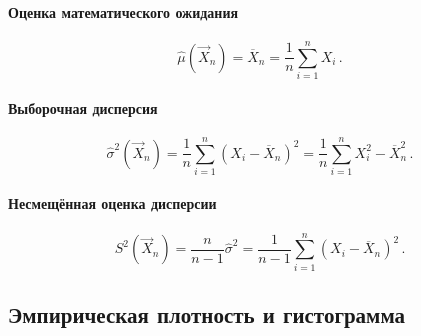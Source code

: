 \paragraph{Оценка математического ожидания}

\begin{equation}
    \hat{\mu}(\vec{X}_n) = \overline{X}_n = \frac{1}{n} \sum_{i = 1}^{n} X_i\,.
\end{equation}


\paragraph{Выборочная дисперсия}

\begin{equation}
    \hat{\sigma}^2(\vec{X}_n) = \frac{1}{n} \sum_{i = 1}^{n}(X_i - \overline{X}_n)^2 = \frac{1}{n} \sum_{i = 1}^{n}X_i^2 - \overline{X}_n^2\,.
\end{equation}


\paragraph{Несмещённая оценка дисперсии}

\begin{equation}
    S^2(\vec{X}_n) = \frac{n}{n - 1}\hat{\sigma}^2 = \frac{1}{n - 1}\sum_{i = 1}^{n} (X_i - \overline{X}_n)^2\,.
\end{equation}



\subsection{Эмпирическая плотность и гистограмма}

